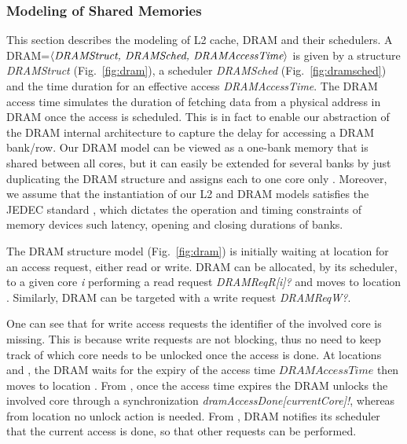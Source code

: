 \subsubsection{Modeling of Shared Memories}
This section describes the modeling of L2 cache, DRAM and their schedulers.  
A DRAM=$\langle \emph{DRAMStruct, DRAMSched, DRAMAccessTime}\rangle$ is given by a structure \emph{DRAMStruct} (Fig.~\ref{fig:dram}), a scheduler \emph{DRAMSched} (Fig.~\ref{fig:dramsched}) and the time duration for an effective access \emph{DRAMAccessTime}. The DRAM access time simulates the duration of fetching data from a physical address in DRAM once the access is scheduled. This is in fact to enable our abstraction of the DRAM internal architecture to capture the delay for accessing a DRAM bank/row. Our DRAM model can be viewed as a one-bank memory that is shared between all cores, but it can easily be extended for several banks by just duplicating the DRAM structure and assigns each to one core only \cite{Heechul2015}. Moreover, we assume that the instantiation of our L2 and DRAM models satisfies the JEDEC standard \cite{Jedec}, which dictates the operation and timing constraints of memory devices such latency, opening and closing durations of banks.


The DRAM structure model (Fig.~\ref{fig:dram}) is initially waiting at location  for an access request, either read or write. DRAM can be allocated, by its scheduler, to a given core \emph{i} performing a read request \emph{DRAMReqR[i]?} and moves to location . Similarly, DRAM can be targeted with a write request \emph{DRAMReqW?}.

One can see that for write access requests the identifier of the involved core is missing. This is because write requests are not blocking, thus no need to keep track of which core needs to be unlocked once the access is done. At locations  and , the DRAM waits for the expiry of the access time \emph{$DRAMAccessTime$} then moves to location . From , once the access time expires the DRAM unlocks the involved core through a synchronization \emph{dramAccessDone[currentCore]!}, whereas from location  no unlock action is needed. From , DRAM notifies its scheduler that the current access is done, so that other requests can be performed.  
  
